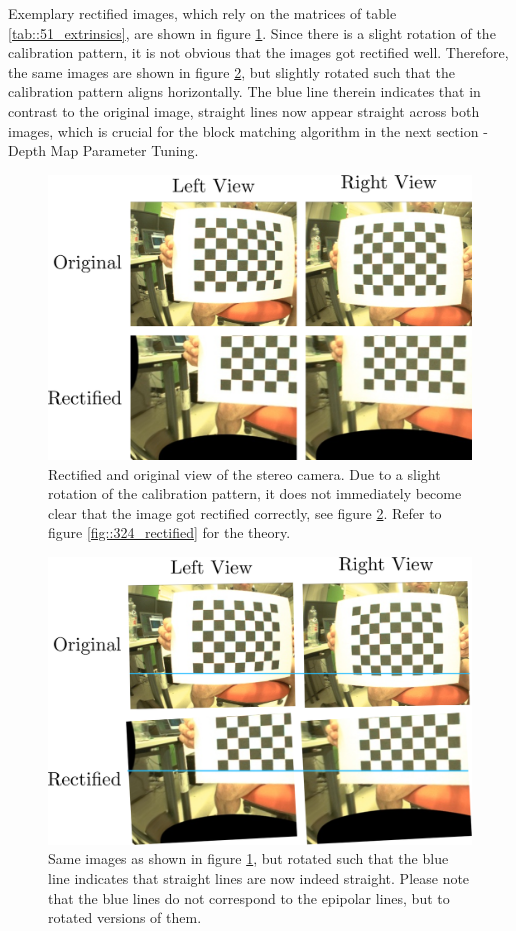 Exemplary rectified images, which rely on the matrices of table \ref{tab::51_extrinsics}, are shown in figure \ref{fig::51_rect}. Since there is a slight rotation of the calibration pattern, it is not obvious that the images got rectified well. Therefore, the same images are shown in figure \ref{fig::51_rect_line}, but slightly rotated such that the calibration pattern aligns horizontally. The blue line therein indicates that in contrast to the original image, straight lines now appear straight across both images, which is crucial for the block matching algorithm in the next section - Depth Map Parameter Tuning.
\begin{figure}[h]
	\centering
	\includegraphics[scale=.28]{chapters/05_experiments/01_camera_calibration/rect.png}
	\caption{Rectified and original view of the stereo camera. Due to a slight rotation of the calibration pattern, it does not immediately become clear that the image got rectified correctly, see figure \ref{fig::51_rect_line}. Refer to figure \ref{fig::324_rectified} for the theory.}
	\label{fig::51_rect}
\end{figure}
\begin{figure}[h]
	\centering
	\includegraphics[scale=.28]{chapters/05_experiments/01_camera_calibration/rect_line.png}
	\caption{Same images as shown in figure \ref{fig::51_rect}, but rotated such that the blue line indicates that straight lines are now indeed straight. Please note that the blue lines do not correspond to the epipolar lines, but to rotated versions of them.}
	\label{fig::51_rect_line}
\end{figure}
